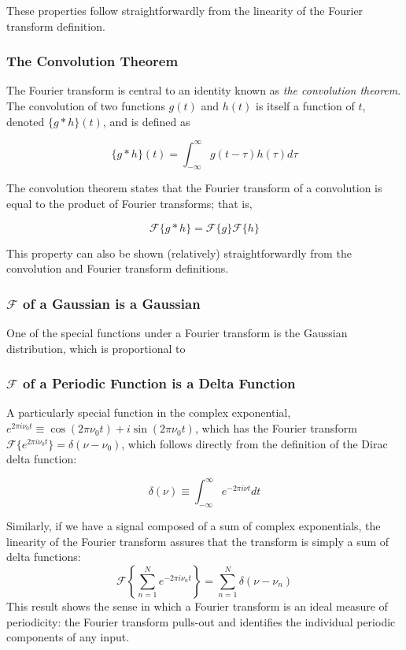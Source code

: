 \documentclass[preprint]{aastex}
\begin{document}
These properties follow straightforwardly from the linearity of the Fourier transform definition.

\subsubsection{The Convolution Theorem}

The Fourier transform is central to an identity known as {\it the convolution theorem}.
The convolution of two functions $g(t)$ and $h(t)$ is itself a function of $t$, denoted $\{g \ast h\}(t)$, and is defined as

\begin{equation}
  \{g \ast h\}(t) = \int_{-\infty}^\infty g(t - \tau) h(\tau) d\tau
\end{equation}

The convolution theorem states that the Fourier transform of a convolution is equal to the product of Fourier transforms; that is,

\begin{equation}
  \mathcal{F}\{g \ast h\} = \mathcal{F}\{g\}\mathcal{F}\{h\}
\end{equation}

This property can also be shown (relatively) straightforwardly from the convolution and Fourier transform definitions.

\subsubsection{$\mathcal{F}$ of a Gaussian is a Gaussian}
One of the special functions under a Fourier transform is the Gaussian distribution, which is proportional to


\subsubsection{$\mathcal{F}$ of a Periodic Function is a Delta Function}

A particularly special function in the complex exponential, $e^{2\pi i\nu_0 t} \equiv \cos(2\pi \nu_0 t) + i\sin(2\pi\nu_0 t)$, which has the Fourier transform $\mathcal{F}\{e^{2\pi i\nu_0 t}\} = \delta(\nu - \nu_0)$, which follows directly from the definition of the Dirac delta function:

\begin{equation}
  \delta(\nu) \equiv \int_{-\infty}^\infty e^{-2\pi i\nu t}dt
\end{equation}

Similarly, if we have a signal composed of a sum of complex exponentials, the linearity of the Fourier transform assures that the transform is simply a sum of delta functions:
\begin{equation}
  \mathcal{F}\left\{ \sum_{n=1}^N e^{-2\pi i \nu_n t} \right\} = \sum_{n=1}^N \delta(\nu - \nu_n)
\end{equation}
This result shows the sense in which a Fourier transform is an ideal measure of periodicity: the Fourier transform pulls-out and identifies the individual periodic components of any input.
\end{document}
